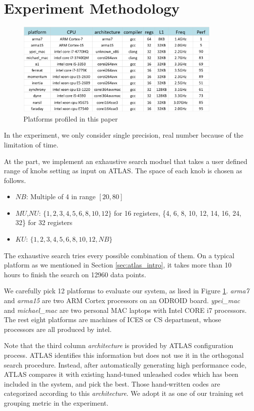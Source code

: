\section{Experiment Methodology}
\label{sec:experiment}
\begin{figure}[tbhp]
  \centering
  \includegraphics[width=0.9\textwidth]{images/platforms.png}
  \caption{Platforms profiled in this paper}
  \label{fig:platforms}
\end{figure}

In the experiment, we only consider single precision, real number \gem because
of the limitation of time.

At the \atl part, we implement an exhaustive search moduel that takes a user
defined range of knobs setting as input on ATLAS.
The space of each knob is chosen as follows.
\begin{itemize}
\item $NB$: Multiple of 4 in range $[20, 80]$
\item $MU$,$NU$: $\{1, 2, 3, 4, 5, 6, 8, 10, 12\}$ for 16 registers, \{4, 6, 8, 10, 12, 14, 16, 24, 32\} for 32 registers
\item $KU$: $\{1, 2, 3, 4, 5, 6, 8, 10, 12, NB\}$
\end{itemize}
The exhaustive search tries every possible combination of them.
On a typical platform as we mentioned in Section \ref{sec:atlas_intro}, it takes more than 10 hours to finish
the search on 12960 data points.\par

We carefully pick 12 platforms to evaluate our system, as lised in Figure \ref{fig:platforms}. \textit{arma7} and \textit{arma15}
are two ARM Cortex processors on an ODROID board.
\textit{ypei\_mac} and \textit{michael\_mac} are two personal MAC laptops
with Intel CORE i7 processors. The rest eight platforms are machines of ICES or CS department, whose processors are all produced by intel.

Note that the third column \textit{architecture} is provided by ATLAS configuration process.
ATLAS identifies this information but does not use it in the orthogonal search procedure. Instead, after automatically
generating high performance code, ATLAS compares it with existing hand-tuned unleashed codes which has been included in the system,
and pick the best. Those hand-written codes are categorized according to this \textit{architecture}.
We adopt it as one of our training set grouping metric in the experiment.\par



